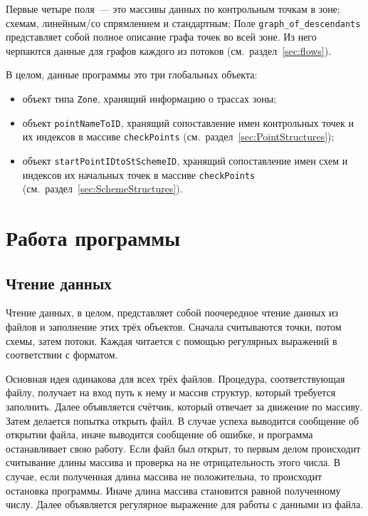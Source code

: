 \documentclass[12pt]{article}
\theoremstyle{plain}
\begin{document}
Первые четыре поля~--- это массивы данных по контрольным точкам в зоне; схемам, линейным/со спрямлением и стандартным; Поле \texttt{graph\_of\_descendants} представляет собой полное описание графа точек во всей зоне. Из него черпаются данные для графов каждого из потоков (см.~раздел~\ref{sec:flows}).

В целом, данные программы это три глобальных объекта:
\begin{itemize}[topsep=-0.5\parsep,itemsep=-0.5\parsep]
  \item объект типа \texttt{Zone}, хранящий информацию о трассах зоны;
  \item объект \texttt{pointNameToID}, хранящий сопоставление имен контрольных точек и их индексов в массиве \texttt{checkPoints} (см.~раздел~\ref{sec:PointStructures});
  \item объект \texttt{startPointIDtoStSchemeID}, хранящий сопоставление имен схем и индексов их начальных точек в массиве \texttt{checkPoints} (см.~раздел~\ref{sec:SchemeStructures}).
\end{itemize}

\section{Работа программы}

\subsection{Чтение данных}

Чтение данных, в целом, представляет собой поочередное чтение данных из файлов и заполнение этих трёх объектов. Сначала считываются точки, потом схемы, затем потоки. Каждая читается с помощью регулярных выражений в соответствии с форматом.

Основная идея одинакова для всех трёх файлов. Процедура, соответствующая файлу, получает на вход путь к нему и массив структур, который требуется заполнить. Далее объявляется счётчик, который отвечает за движение по массиву. Затем делается попытка открыть файл. В случае успеха выводится сообщение об открытии файла, иначе выводится сообщение об ошибке, и программа останавливает свою работу. Если файл был открыт, то первым делом происходит считывание длины массива и проверка на не отрицательность этого числа. В случае, если полученная длина массива не положительна, то происходит остановка программы. Иначе длина массива становится равной полученному числу. Далее объявляется регулярное выражение для работы с данными из файла. 
\end{document}
